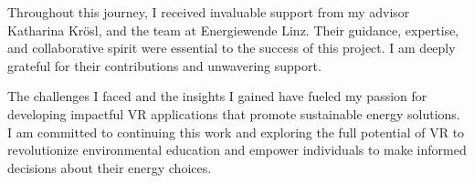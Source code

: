 \documentclass[draft, final]{vutinfth} %
\begin{document}
Throughout this journey, I received invaluable support from my advisor Katharina Krösl, and the team at Energiewende Linz. Their guidance, expertise, and collaborative spirit were essential to the success of this project. I am deeply grateful for their contributions and unwavering support.

The challenges I faced and the insights I gained have fueled my passion for developing impactful VR applications that promote sustainable energy solutions. I am committed to continuing this work and exploring the full potential of VR to revolutionize environmental education and empower individuals to make informed decisions about their energy choices.

\backmatter

\listoffigures %



\printindex

\printglossaries


% 
% 

\end{document}
